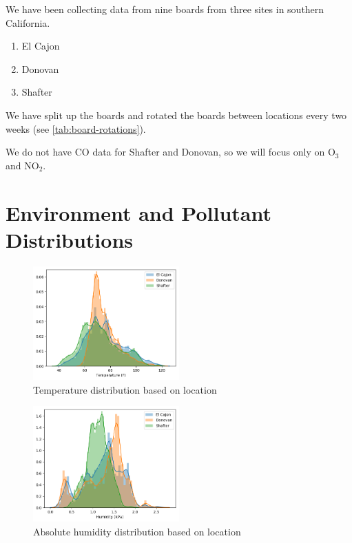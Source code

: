 \documentclass[journal abbreviation, manuscript]{copernicus}
\newcommand\todo[1]{\textcolor{red}{#1}}
\newcommand{\textus}[1]{$_{\text{#1}}$}
\begin{document}
We have been collecting data from nine boards
from three sites in southern California.
\begin{enumerate}
    \item El Cajon
    \item Donovan
    \item Shafter
\end{enumerate}
We have split up the boards and rotated the boards
between locations every two weeks (see \autoref{tab:board-rotations}).

We do not have CO data for Shafter and Donovan, so we will focus only on
O\textus{3} and NO\textus{2}.
\fi


\section{Environment and Pollutant Distributions}\label{Distributions}




\iffalse

\begin{figure}[H]
\centering
\includegraphics[width=0.5\textwidth]{results/distributions/temperature.png}
\caption{Temperature distribution based on
location}
\label{fig:temperature}
\end{figure}

\begin{figure}[H]
\centering
\includegraphics[width=0.5\textwidth]{results/distributions/humidity.png}
\caption{Absolute humidity distribution based on
location}
\label{fig:humidity}
\end{figure}
\end{document}
